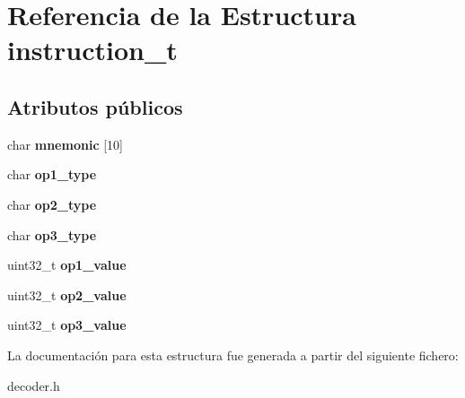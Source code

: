 \hypertarget{structinstruction__t}{}\section{Referencia de la Estructura instruction\+\_\+t}
\label{structinstruction__t}
\subsection*{Atributos públicos}
\begin{DoxyCompactItemize}
\item 
\hypertarget{structinstruction__t_a21c70f3cc29824d5ea5f9ee20d244b2a}{}char {\bfseries mnemonic} \mbox{[}10\mbox{]}\label{structinstruction__t_a21c70f3cc29824d5ea5f9ee20d244b2a}

\item 
\hypertarget{structinstruction__t_aed69e0669a1e61f087a2c2c24125eff0}{}char {\bfseries op1\+\_\+type}\label{structinstruction__t_aed69e0669a1e61f087a2c2c24125eff0}

\item 
\hypertarget{structinstruction__t_a4d2fca7cc0ba4fd9791df9b180fd2c20}{}char {\bfseries op2\+\_\+type}\label{structinstruction__t_a4d2fca7cc0ba4fd9791df9b180fd2c20}

\item 
\hypertarget{structinstruction__t_acdf860d20e64a274dae5b473126ff245}{}char {\bfseries op3\+\_\+type}\label{structinstruction__t_acdf860d20e64a274dae5b473126ff245}

\item 
\hypertarget{structinstruction__t_a1e148ba27c8a2d1961416f858453c407}{}uint32\+\_\+t {\bfseries op1\+\_\+value}\label{structinstruction__t_a1e148ba27c8a2d1961416f858453c407}

\item 
\hypertarget{structinstruction__t_afa17be1ea5a72144032372faea594273}{}uint32\+\_\+t {\bfseries op2\+\_\+value}\label{structinstruction__t_afa17be1ea5a72144032372faea594273}

\item 
\hypertarget{structinstruction__t_afc117cadff4b36a90a01d7f268a6332a}{}uint32\+\_\+t {\bfseries op3\+\_\+value}\label{structinstruction__t_afc117cadff4b36a90a01d7f268a6332a}

\end{DoxyCompactItemize}


La documentación para esta estructura fue generada a partir del siguiente fichero\+:\begin{DoxyCompactItemize}
\item 
decoder.\+h\end{DoxyCompactItemize}
